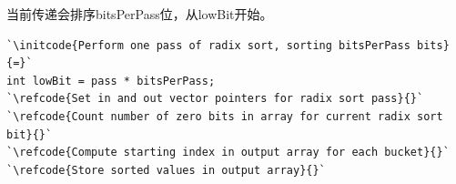 当前传递会排序{\ttfamily bitsPerPass}位，从{\ttfamily lowBit}开始。
\begin{lstlisting}
`\initcode{Perform one pass of radix sort, sorting bitsPerPass bits}{=}`
int lowBit = pass * bitsPerPass;
`\refcode{Set in and out vector pointers for radix sort pass}{}`
`\refcode{Count number of zero bits in array for current radix sort bit}{}`
`\refcode{Compute starting index in output array for each bucket}{}`
`\refcode{Store sorted values in output array}{}`
\end{lstlisting}

